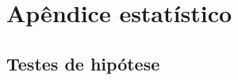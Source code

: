 \titleformat{\chapter}[display]{\normalfont\huge}{\appendixname{} \thechapter}{20pt}{\bfseries\huge}
\chapter{Apêndice estatístico}
\label{Append_Stat}

\section{Testes de hipótese}

